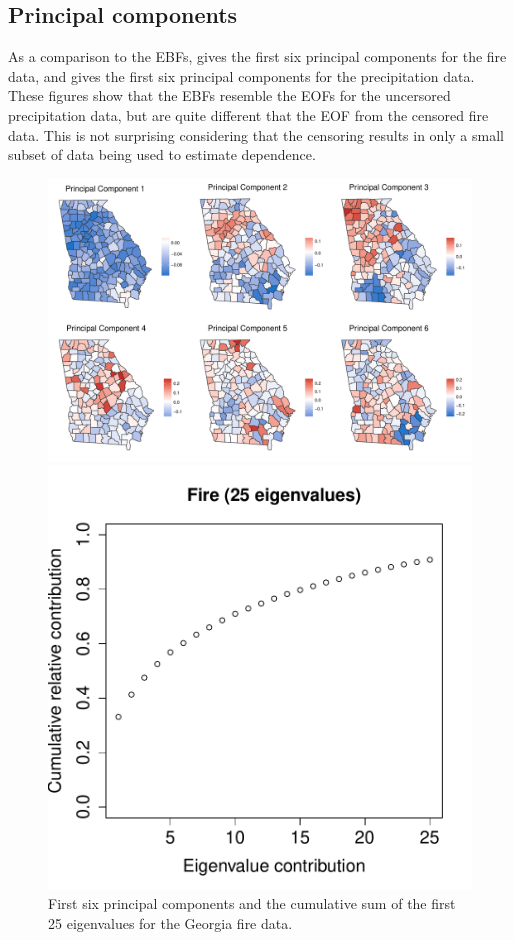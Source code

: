 \documentclass[11pt]{article}
\begin{document}
\subsection{Principal components} \label{eba:pca}
As a comparison to the EBFs,  gives the first six principal components for the fire data, and  gives the first six principal components for the precipitation data.
These figures show that the EBFs resemble the EOFs  for the uncersored precipitation data, but are quite different that the EOF from the censored fire data.
This is not surprising considering that the censoring results in only a small subset of data being used to estimate dependence.
\begin{figure}[htbp] %
  \centering
  \includegraphics[width=\linewidth]{plots/fire-eig-panel.pdf}

  \includegraphics[width=0.35\linewidth]{plots/firelambda-25.pdf}
  \caption{First six principal components and the cumulative sum of the first 25 eigenvalues for the Georgia fire data.}
  \label{ebfig:fire-eigpanel}
\end{figure}
\end{document}
